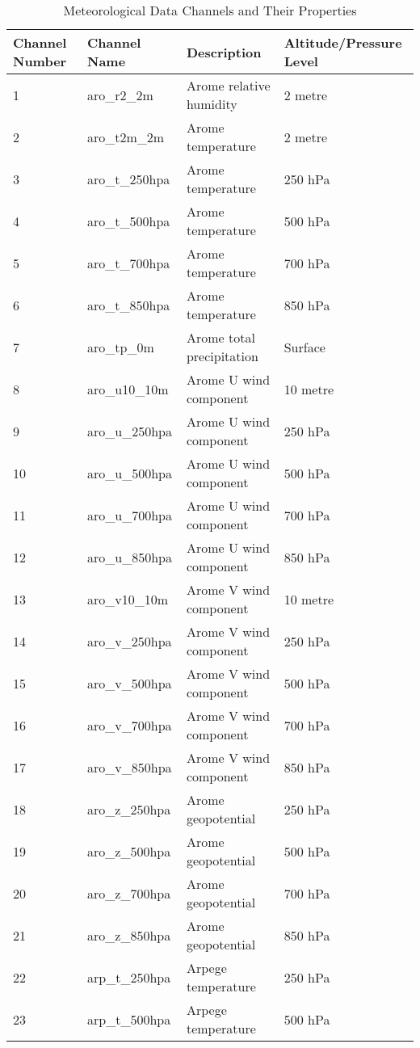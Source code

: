 \begin{table}[h]
\centering
\caption{Meteorological Data Channels and Their Properties}
\label{tab:meteo_channels}
\begin{tabular}{llll}
\hline
\textbf{Channel Number} & {Channel Name} & \textbf{Description} & \textbf{Altitude/Pressure Level} \\
\hline
1 & aro\_r2\_2m        & Arome relative humidity & 2 metre \\
2 & aro\_t2m\_2m       & Arome temperature & 2 metre \\
3 & aro\_t\_250hpa     & Arome temperature & 250 hPa \\
4 & aro\_t\_500hpa     & Arome temperature & 500 hPa \\
5 & aro\_t\_700hpa     & Arome temperature & 700 hPa \\
6 & aro\_t\_850hpa     & Arome temperature & 850 hPa \\
7 & aro\_tp\_0m        & Arome total precipitation & Surface \\
8 & aro\_u10\_10m      & Arome U wind component & 10 metre \\
9 & aro\_u\_250hpa     & Arome U wind component & 250 hPa \\
10 & aro\_u\_500hpa     & Arome U wind component & 500 hPa \\
11 & aro\_u\_700hpa     & Arome U wind component & 700 hPa \\
12 & aro\_u\_850hpa     & Arome U wind component & 850 hPa \\
13 & aro\_v10\_10m      & Arome V wind component & 10 metre \\
14 & aro\_v\_250hpa     & Arome V wind component & 250 hPa \\
15 & aro\_v\_500hpa     & Arome V wind component & 500 hPa \\
16 & aro\_v\_700hpa     & Arome V wind component & 700 hPa \\
17 & aro\_v\_850hpa     & Arome V wind component & 850 hPa \\
18 & aro\_z\_250hpa     & Arome geopotential & 250 hPa \\
19 & aro\_z\_500hpa     & Arome geopotential & 500 hPa \\
20 & aro\_z\_700hpa     & Arome geopotential & 700 hPa \\
21 & aro\_z\_850hpa     & Arome geopotential & 850 hPa \\
22 & arp\_t\_250hpa     & Arpege temperature & 250 hPa \\
23 & arp\_t\_500hpa     & Arpege temperature & 500 hPa \\

\end{tabular}
\end{table}
